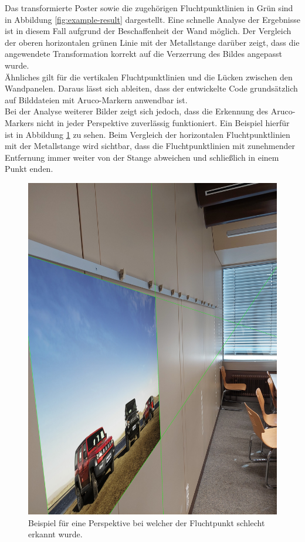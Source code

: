 \documentclass[a4paper,twocolumn]{article}
\begin{document}
Das transformierte Poster sowie die zugehörigen Fluchtpunktlinien in Grün sind in Abbildung \ref{fig:example-result} dargestellt. Eine schnelle Analyse der Ergebnisse ist in diesem Fall aufgrund der Beschaffenheit der Wand möglich. Der Vergleich der oberen horizontalen grünen Linie mit der Metallstange darüber zeigt, dass die angewendete Transformation korrekt auf die Verzerrung des Bildes angepasst wurde.
\\
Ähnliches gilt für die vertikalen Fluchtpunktlinien und die Lücken zwischen den Wandpanelen. Daraus lässt sich ableiten, dass der entwickelte Code grundsätzlich auf Bilddateien mit Aruco-Markern anwendbar ist.
\\
Bei der Analyse weiterer Bilder zeigt sich jedoch, dass die Erkennung des Aruco-Markers nicht in jeder Perspektive zuverlässig funktioniert. Ein Beispiel hierfür ist in Abbildung \ref{fig:bad-example-result} zu sehen. Beim Vergleich der horizontalen Fluchtpunktlinien mit der Metallstange wird sichtbar, dass die Fluchtpunktlinien mit zunehmender Entfernung immer weiter von der Stange abweichen und schließlich in einem Punkt enden.\begin{figure}[h!]
    \centering
    \includegraphics[width=0.9\columnwidth]{img/img_result_bad_113437.jpg} %
    \caption{Beispiel für eine Perspektive bei welcher der Fluchtpunkt schlecht erkannt wurde.}
    \label{fig:bad-example-result}
\end{figure}
\end{document}
